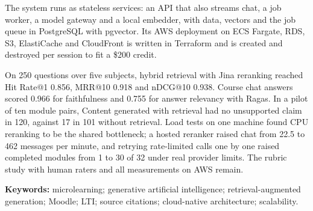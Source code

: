 \documentclass[oneside,final]{hcmut-report}
\begin{document}
The system runs as stateless services: an API that also streams chat, a job worker, a model gateway and a local embedder, with data, vectors and the job queue in PostgreSQL with pgvector. Its AWS deployment on ECS Fargate, RDS, S3, ElastiCache and CloudFront is written in Terraform and is created and destroyed per session to fit a \$200 credit.

On 250 questions over five subjects, hybrid retrieval with Jina reranking reached Hit Rate@1 0.856, MRR@10 0.918 and nDCG@10 0.938. Course chat answers scored 0.966 for faithfulness and 0.755 for answer relevancy with Ragas. In a pilot of ten module pairs, Content generated with retrieval had no unsupported claim in 120, against 17 in 101 without retrieval. Load tests on one machine found CPU reranking to be the shared bottleneck; a hosted reranker raised chat from 22.5 to 462 messages per minute, and retrying rate-limited calls one by one raised completed modules from 1 to 30 of 32 under real provider limits. The rubric study with human raters and all measurements on AWS remain.

\noindent\textbf{Keywords:} microlearning; generative artificial intelligence; retrieval-augmented generation; Moodle; LTI; source citations; cloud-native architecture; scalability.
\clearpage
\tableofcontents
\listoffigures
\listoftables
\clearpage

\clearpage
{}
\pagestyle{fancy}













\clearpage
{}
{}


\end{document}
